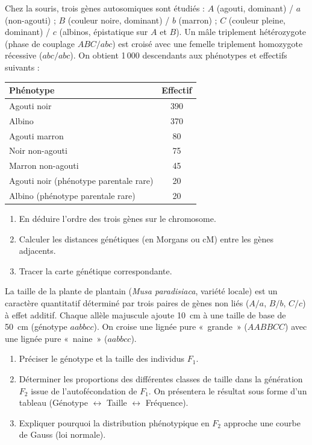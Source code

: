 \documentclass[11pt]{article}
\begin{document}
\begin{exercice}
Chez la souris, trois gènes autosomiques sont étudiés : $A$ (agouti, dominant) / $a$ (non-agouti) ; $B$ (couleur noire, dominant) / $b$ (marron) ; $C$ (couleur pleine, dominant) / $c$ (albinos, épistatique sur $A$ et $B$).
Un mâle triplement hétérozygote (phase de couplage $ABC/abc$) est croisé avec une femelle triplement homozygote récessive ($abc/abc$).
On obtient 1\,000 descendants aux phénotypes et effectifs suivants :
\begin{center}
\begin{tabular}{|l|c|}
\hline
Phénotype & Effectif \\
\hline
Agouti noir & 390 \\
Albino & 370 \\
Agouti marron & 80 \\
Noir non-agouti & 75 \\
Marron non-agouti & 45 \\
Agouti noir (phénotype parentale rare) & 20 \\
Albino (phénotype parentale rare) & 20 \\
\hline
\end{tabular}
\end{center}
\begin{enumerate}
    \item En déduire l'ordre des trois gènes sur le chromosome.
    \item Calculer les distances génétiques (en Morgans ou cM) entre les gènes adjacents.
    \item Tracer la carte génétique correspondante.
\end{enumerate}
\end{exercice}

\begin{exercice}
La taille de la plante de plantain (\textit{Musa paradisiaca}, variété locale) est un caractère quantitatif déterminé par trois paires de gènes non liés ($A/a$, $B/b$, $C/c$) à effet additif. Chaque allèle majuscule ajoute \SI{10}{cm} à une taille de base de \SI{50}{cm} (génotype $aabbcc$).
On croise une lignée pure «~grande~» ($AABBCC$) avec une lignée pure «~naine~» ($aabbcc$).
\begin{enumerate}
    \item Préciser le génotype et la taille des individus $F_1$.
    \item Déterminer les proportions des différentes classes de taille dans la génération $F_2$ issue de l'autofécondation de $F_1$. On présentera le résultat sous forme d'un tableau (Génotype $\leftrightarrow$ Taille $\leftrightarrow$ Fréquence).
    \item Expliquer pourquoi la distribution phénotypique en $F_2$ approche une courbe de Gauss (loi normale).
\end{enumerate}
\end{exercice}
\end{document}
